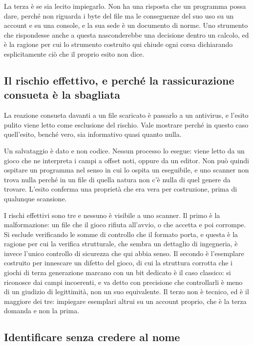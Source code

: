 La terza è se sia lecito impiegarlo. Non ha una risposta che un programma possa dare, perché non riguarda i byte del file ma le conseguenze del suo uso su un account e su una console, e la sua sede è un documento di norme. Uno strumento che rispondesse anche a questa nasconderebbe una decisione dentro un calcolo, ed è la ragione per cui lo strumento costruito qui chiude ogni corsa dichiarando esplicitamente ciò che il proprio esito non dice.

\subsection*{Il rischio effettivo, e perché la rassicurazione consueta è la sbagliata}

La reazione consueta davanti a un file scaricato è passarlo a un antivirus, e l'esito pulito viene letto come esclusione del rischio. Vale mostrare perché in questo caso quell'esito, benché vero, sia informativo quasi quanto nulla.

Un salvataggio è dato e non codice. Nessun processo lo esegue: viene letto da un gioco che ne interpreta i campi a offset noti, oppure da un editor. Non può quindi ospitare un programma nel senso in cui lo ospita un eseguibile, e uno scanner non trova nulla perché in un file di quella natura non c'è nulla di quel genere da trovare. L'esito conferma una proprietà che era vera per costruzione, prima di qualunque scansione.

I rischi effettivi sono tre e nessuno è visibile a uno scanner. Il primo è la malformazione: un file che il gioco rifiuta all'avvio, o che accetta e poi corrompe. Si esclude verificando le somme di controllo che il formato porta, e questa è la ragione per cui la verifica strutturale, che sembra un dettaglio di ingegneria, è invece l'unico controllo di sicurezza che qui abbia senso. Il secondo è l'esemplare costruito per innescare un difetto del gioco, di cui la struttura corrotta che i giochi di terza generazione marcano con un bit dedicato è il caso classico: si riconosce dai campi incoerenti, e va detto con precisione che controllarli è meno di un giudizio di legittimità, non un suo equivalente. Il terzo non è tecnico, ed è il maggiore dei tre: impiegare esemplari altrui su un account proprio, che è la terza domanda e non la prima.

\subsection*{Identificare senza credere al nome}

